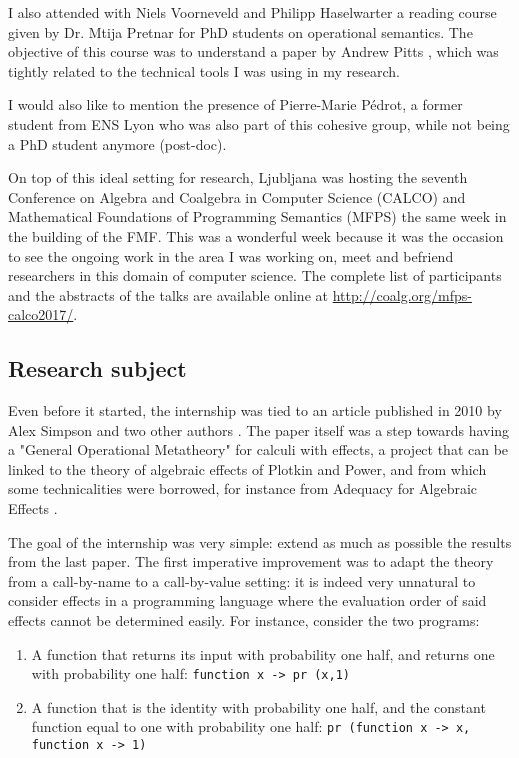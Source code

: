 I also attended with Niels Voorneveld and Philipp Haselwarter 
a reading course given by Dr. Mtija Pretnar for PhD students on operational semantics. The 
objective of this course was to understand a paper by Andrew Pitts 
\cite{Pitts2000}, which was tightly related to the technical tools I was 
using in my research. 

I would also like to mention the presence of 
Pierre-Marie Pédrot, a former student from ENS Lyon 
who was also part of this cohesive group, while 
not being a PhD student anymore (post-doc).

On top of this ideal setting for research, 
Ljubljana was hosting the seventh Conference on Algebra and
Coalgebra in Computer Science (CALCO) and 
Mathematical Foundations of Programming Semantics (MFPS)
the same week in the building of the FMF. This was
a wonderful week because it was the occasion 
to see the ongoing work in the area I was working on,
meet and befriend researchers in this domain 
of computer science. The complete list of participants 
and the abstracts of the talks are
available online at \url{http://coalg.org/mfps-calco2017/}.

\subsection{Research subject}

Even before it started, the internship 
was tied to an article published in 2010 
by Alex Simpson and two other authors \cite{gom}.
The paper itself was a step towards having a 
"General Operational Metatheory" for calculi 
with effects, a project that can be linked 
to the theory of algebraic effects of Plotkin 
and Power, and from which some technicalities 
were borrowed, for instance from 
Adequacy for Algebraic Effects \cite{plotkin2001adequacy}.

The goal of the internship was very simple: extend 
as much as possible the results from the last paper. 
The first imperative improvement was to adapt the theory 
from a call-by-name to a call-by-value setting:
it is indeed very unnatural to consider effects in 
a programming language where the evaluation order of said 
effects cannot be determined easily. For instance, consider 
the two programs:

\begin{enumerate}
    \item A function that returns its input with probability 
        one half, and returns one with probability one half: 
        \texttt{function x -> pr (x,1)}
    \item A function that is the identity with probability 
        one half, and the constant function equal to one 
        with probability one half: 
        \texttt{pr (function x -> x, function x -> 1)}
\end{enumerate}

